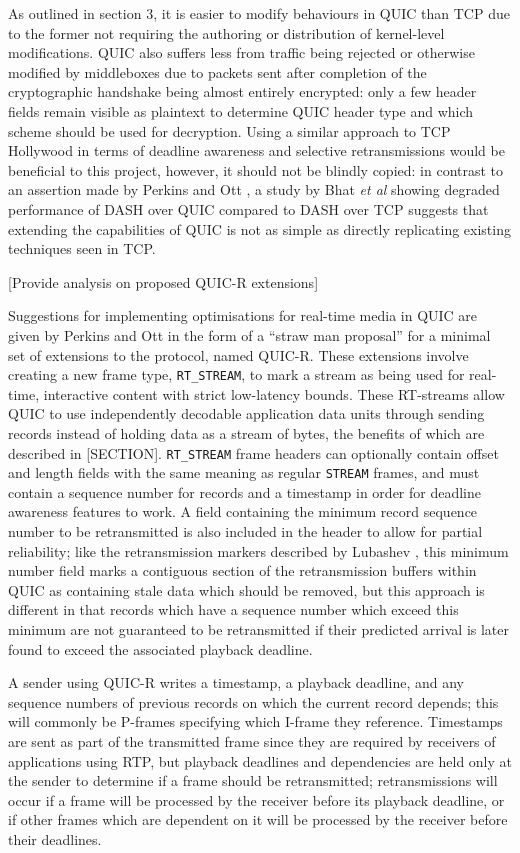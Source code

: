 \documentclass{mprop}
\begin{document}
As outlined in section 3, it is easier to modify behaviours in QUIC than TCP due to the former not requiring the authoring or distribution of kernel-level modifications. QUIC also suffers less from traffic being rejected or otherwise modified by middleboxes due to packets sent after completion of the cryptographic handshake being almost entirely encrypted: only a few header fields remain visible as plaintext to determine QUIC header type and which scheme should be used for decryption. Using a similar approach to TCP Hollywood in terms of deadline awareness and selective retransmissions would be beneficial to this project, however, it should not be blindly copied: in contrast to an assertion made by Perkins and Ott \cite{Perkins2018}, a study by Bhat \textit{et al} \cite{Bhat2017} showing degraded performance of DASH over QUIC compared to DASH over TCP suggests that extending the capabilities of QUIC is not as simple as directly replicating existing techniques seen in TCP.

[Provide analysis on proposed QUIC-R extensions]

Suggestions for implementing optimisations for real-time media in QUIC are given by Perkins and Ott in the form of a ``straw man proposal'' for a minimal set of extensions to the protocol, named QUIC-R. These extensions involve creating a new frame type, \texttt{RT\_STREAM}, to mark a stream as being used for real-time, interactive content with strict low-latency bounds. These RT-streams allow QUIC to use independently decodable application data units through sending records instead of holding data as a stream of bytes, the benefits of which are described in [SECTION]. \texttt{RT\_STREAM} frame headers can optionally contain offset and length fields with the same meaning as regular \texttt{STREAM} frames, and must contain a sequence number for records and a timestamp in order for deadline awareness features to work. A field containing the minimum record sequence number to be retransmitted is also included in the header to allow for partial reliability; like the retransmission markers described by Lubashev \cite{Lubashev2018}, this minimum number field marks a contiguous section of the retransmission buffers within QUIC as containing stale data which should be removed, but this approach is different in that records which have a sequence number which exceed this minimum are not guaranteed to be retransmitted if their predicted arrival is later found to exceed the associated playback deadline.

A sender using QUIC-R writes a timestamp, a playback deadline, and any sequence numbers of previous records on which the current record depends; this will commonly be P-frames specifying which I-frame they reference. Timestamps are sent as part of the transmitted frame since they are required by receivers of applications using RTP, but playback deadlines and dependencies are held only at the sender to determine if a frame should be retransmitted; retransmissions will occur if a frame will be processed by the receiver before its playback deadline, or if other frames which are dependent on it will be processed by the receiver before their deadlines.
\end{document}
